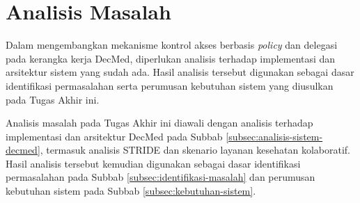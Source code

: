 \section{Analisis Masalah}
\label{sec:analisis-masalah}

Dalam mengembangkan mekanisme kontrol akses berbasis \textit{policy} dan delegasi pada kerangka kerja DecMed, diperlukan analisis terhadap implementasi dan arsitektur sistem yang sudah ada. Hasil analisis tersebut digunakan sebagai dasar identifikasi permasalahan serta perumusan kebutuhan sistem yang diusulkan pada Tugas Akhir ini.

Analisis masalah pada Tugas Akhir ini diawali dengan analisis terhadap implementasi dan arsitektur DecMed pada Subbab \ref{subsec:analisis-sistem-decmed}, termasuk analisis STRIDE dan skenario layanan kesehatan kolaboratif. Hasil analisis tersebut kemudian digunakan sebagai dasar identifikasi permasalahan pada Subbab \ref{subsec:identifikasi-masalah} dan perumusan kebutuhan sistem pada Subbab \ref{subsec:kebutuhan-sistem}.




